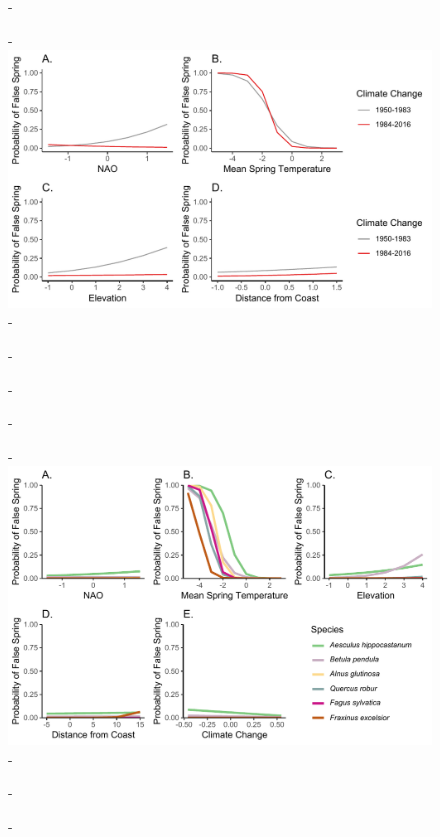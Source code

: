 \documentclass{article}\usepackage[]{graphicx}\usepackage[]{color}
\begin{document}
{\begin{figure} [H]
  -\begin{center}
  -\includegraphics[width=16cm]{..//figures/InteractionPlots/IntrxnPlots_dvr.pdf}
  -\caption{}\label{fig:intrxns}
  -\end{center}
  -\end{figure}}
  
{\begin{figure} [H]
  -\begin{center}
  -\includegraphics[width=16cm]{..//figures/InteractionPlots/Species_dvr.pdf}
  -\caption{}\label{fig:spp}
  -\end{center}
  -\end{figure}}
\end{document}
